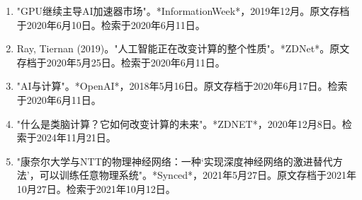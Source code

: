 \begin{enumerate}
\item "GPU继续主导AI加速器市场"。*InformationWeek*，2019年12月。原文存档于2020年6月10日。检索于2020年6月11日。
\item Ray, Tiernan (2019)。"人工智能正在改变计算的整个性质"。*ZDNet*。原文存档于2020年5月25日。检索于2020年6月11日。
\item "AI与计算"。*OpenAI*，2018年5月16日。原文存档于2020年6月17日。检索于2020年6月11日。
\item "什么是类脑计算？它如何改变计算的未来"。*ZDNET*，2020年12月8日。检索于2024年11月21日。
\item "康奈尔大学与NTT的物理神经网络：一种‘实现深度神经网络的激进替代方法’，可以训练任意物理系统"。*Synced*，2021年5月27日。原文存档于2021年10月27日。检索于2021年10月12日。

\end{enumerate}